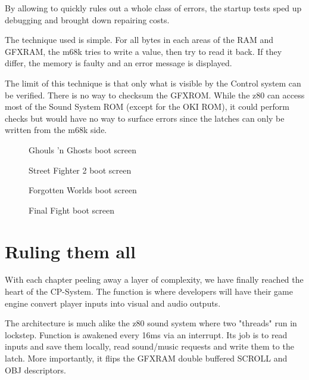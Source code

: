 By allowing to quickly rules out a whole class of errors, the startup tests sped up debugging and brought down repairing costs.

The technique used is simple. For all bytes in each areas of the RAM and GFXRAM, the m68k tries to write a value, then try to read it back. If they differ, the memory is faulty and an error message is displayed. 

The limit of this technique is that only what is visible by the Control system can be verified. There is no way to checksum the GFXROM. While the z80 can access most of the Sound System ROM (except for the OKI ROM), it could perform checks but would have no way to surface errors since the latches can only be written from the m68k side.
\vfill
\begin{figure}[H]
\caption*{Ghouls 'n Ghosts boot screen}
\end{figure}


\begin{figure}[H]
\caption*{Street Fighter 2 boot screen}
\end{figure}










\begin{figure}[H]
\caption*{Forgotten Worlds boot screen}
\end{figure}



\vfill
\begin{figure}[H]
\caption*{Final Fight boot screen}
\end{figure}






\section{Ruling them all}
With each chapter peeling away a layer of complexity, we have finally reached the heart of the CP-System. 
The function  is where developers will have their game engine convert player inputs into visual and audio outputs.

The architecture is much alike the z80 sound system where two "threads" run in lockstep. Function  is awakened every 16ms via an interrupt. Its job is to read inputs and save them locally, read sound/music requests and write them to the latch. More importantly, it flips the GFXRAM double buffered SCROLL and OBJ descriptors. 

